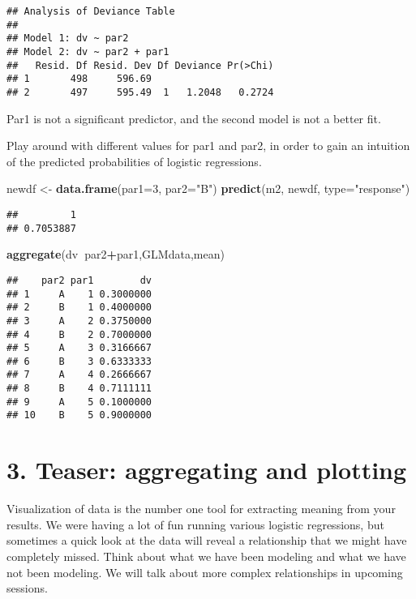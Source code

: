 \documentclass[
]{article}
\newenvironment{Shaded}{\begin{snugshade}}{\end{snugshade}}
\newcommand{\DataTypeTok}[1]{\textcolor[rgb]{0.13,0.29,0.53}{#1}}
\newcommand{\DecValTok}[1]{\textcolor[rgb]{0.00,0.00,0.81}{#1}}
\newcommand{\KeywordTok}[1]{\textcolor[rgb]{0.13,0.29,0.53}{\textbf{#1}}}
\newcommand{\NormalTok}[1]{#1}
\newcommand{\OperatorTok}[1]{\textcolor[rgb]{0.81,0.36,0.00}{\textbf{#1}}}
\newcommand{\StringTok}[1]{\textcolor[rgb]{0.31,0.60,0.02}{#1}}
\begin{document}
\begin{verbatim}
## Analysis of Deviance Table
## 
## Model 1: dv ~ par2
## Model 2: dv ~ par2 + par1
##   Resid. Df Resid. Dev Df Deviance Pr(>Chi)
## 1       498     596.69                     
## 2       497     595.49  1   1.2048   0.2724
\end{verbatim}

Par1 is not a significant predictor, and the second model is not a
better fit.

Play around with different values for par1 and par2, in order to gain an
intuition of the predicted probabilities of logistic regressions.

\begin{Shaded}
\begin{Highlighting}[]
\NormalTok{newdf <-}\StringTok{ }\KeywordTok{data.frame}\NormalTok{(}\DataTypeTok{par1=}\DecValTok{3}\NormalTok{, }\DataTypeTok{par2=}\StringTok{"B"}\NormalTok{)}
\KeywordTok{predict}\NormalTok{(m2, newdf, }\DataTypeTok{type=}\StringTok{"response"}\NormalTok{)}
\end{Highlighting}
\end{Shaded}

\begin{verbatim}
##         1 
## 0.7053887
\end{verbatim}

\begin{Shaded}
\begin{Highlighting}[]
\KeywordTok{aggregate}\NormalTok{(dv}\OperatorTok{~}\NormalTok{par2}\OperatorTok{+}\NormalTok{par1,GLMdata,mean)}
\end{Highlighting}
\end{Shaded}

\begin{verbatim}
##    par2 par1        dv
## 1     A    1 0.3000000
## 2     B    1 0.4000000
## 3     A    2 0.3750000
## 4     B    2 0.7000000
## 5     A    3 0.3166667
## 6     B    3 0.6333333
## 7     A    4 0.2666667
## 8     B    4 0.7111111
## 9     A    5 0.1000000
## 10    B    5 0.9000000
\end{verbatim}

\hypertarget{teaser-aggregating-and-plotting}{%
\section{3. Teaser: aggregating and
plotting}\label{teaser-aggregating-and-plotting}}

Visualization of data is the number one tool for extracting meaning from
your results. We were having a lot of fun running various logistic
regressions, but sometimes a quick look at the data will reveal a
relationship that we might have completely missed. Think about what we
have been modeling and what we have not been modeling. We will talk
about more complex relationships in upcoming sessions.
\end{document}
